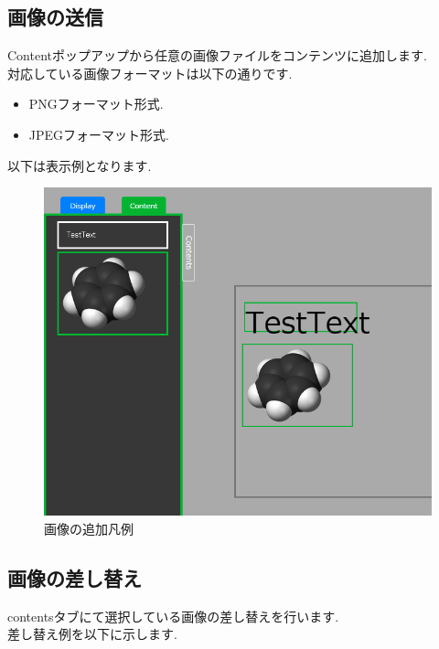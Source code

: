 \documentclass[a4paper,10pt,oneside]{jsbook}
\begin{document}
\newpage





\subsection{画像の送信}
Contentポップアップから任意の画像ファイルをコンテンツに追加します.\\
対応している画像フォーマットは以下の通りです.\\

\begin{itemize}
\item PNGフォーマット形式.
\item JPEGフォーマット形式.
\end{itemize}

以下は表示例となります.\\
\begin{figure}[htbp]
	\begin{center}
		\includegraphics[width=11.5cm]{image/AddContent_Picture_View.PNG}
	\end{center}
	\caption{画像の追加凡例}
	\label{fig:addimage}
\end{figure}



\newpage

\subsection{画像の差し替え}
contentsタブにて選択している画像の差し替えを行います.\\
差し替え例を以下に示します.\\
\end{document}
